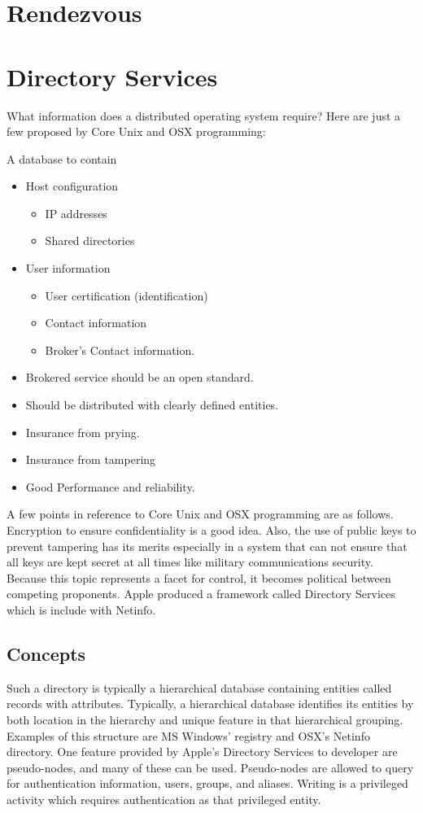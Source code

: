 \documentclass[11pt]{article}
\begin{document}
\section {Rendezvous}

\section {Directory Services}
What information does a distributed operating system require?  Here are just a few proposed by Core Unix and OSX programming:

A database to contain 
\begin{itemize}
\item Host configuration
\begin{itemize}
\item IP addresses
\item Shared directories
\end{itemize}
\item User information
\begin{itemize}
\item User certification (identification)
\item Contact information
\item Broker's Contact information.
\end{itemize}
\item Brokered service should be an open standard.
\item Should be distributed with clearly defined entities.
\item Insurance from prying.
\item Insurance from tampering
\item Good Performance and reliability.
\end{itemize}

A few points in reference to Core Unix and OSX programming are as follows.  Encryption to ensure confidentiality is a good idea.  Also, the use of public keys to prevent tampering has its merits especially in a system that can not ensure that all keys are kept secret at all times like military communications security.  Because this topic represents a facet for control, it becomes political between competing proponents.    Apple produced a framework called Directory Services which is include with Netinfo.  

\subsection {Concepts}
Such a directory is typically a hierarchical database containing entities called records with attributes.  Typically, a hierarchical database identifies its entities by both location in the hierarchy and unique feature in that hierarchical grouping.   Examples of this structure are MS Windows' registry  and OSX's Netinfo directory.  One feature provided by Apple's Directory Services to developer are pseudo-nodes, and many of these can be used.  Pseudo-nodes are allowed to query for authentication information, users, groups, and aliases.  Writing is a privileged activity which requires authentication as that privileged entity.  
\end{document}
